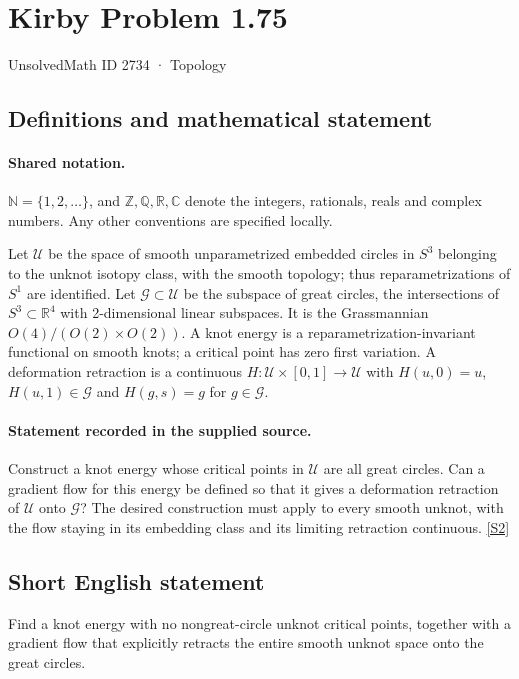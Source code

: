 \documentclass[11pt]{article}
\newcommand{\sref}[2]{\hyperlink{source:#1:#2}{[S#2]}}
\begin{document}
\setcounter{section}{2733}
\section{Kirby Problem 1.75}\label{2734}
{\small\sffamily UnsolvedMath ID 2734 · Topology}
\subsection{Definitions and mathematical statement}

\paragraph{Shared notation.}$\mathbb N=\{1,2,\ldots\}$, and $\mathbb Z,\mathbb Q,\mathbb R,\mathbb C$ denote the integers, rationals, reals and complex numbers. Any other conventions are specified locally.


Let $\mathcal U$ be the space of smooth unparametrized embedded circles in $S^3$ belonging to the unknot isotopy class, with the smooth topology; thus reparametrizations of $S^1$ are identified. Let $\mathcal G\subset\mathcal U$ be the subspace of great circles, the intersections of $S^3\subset\mathbb R^4$ with 2-dimensional linear subspaces. It is the Grassmannian $O(4)/(O(2)\times O(2))$. A knot energy is a reparametrization-invariant functional on smooth knots; a critical point has zero first variation. A deformation retraction is a continuous $H:\mathcal U\times[0,1]\to\mathcal U$ with $H(u,0)=u$, $H(u,1)\in\mathcal G$ and $H(g,s)=g$ for $g\in\mathcal G$.
\paragraph{Statement recorded in the supplied source.}
Construct a knot energy whose critical points in $\mathcal U$ are all great circles. Can a gradient flow for this energy be defined so that it gives a deformation retraction of $\mathcal U$ onto $\mathcal G$? The desired construction must apply to every smooth unknot, with the flow staying in its embedding class and its limiting retraction continuous. \sref{2734}{2}

\subsection{Short English statement}
Find a knot energy with no nongreat-circle unknot critical points, together with a gradient flow that explicitly retracts the entire smooth unknot space onto the great circles.
\end{document}
